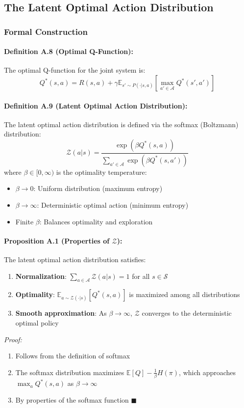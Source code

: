 \documentclass[10pt, letterpaper]{article}
\begin{document}
\subsection{The Latent Optimal Action Distribution}

\subsubsection{Formal Construction}

\paragraph{Definition A.8 (Optimal Q-Function):} The optimal Q-function for the joint system is:
\[Q^*(s, a) = R(s, a) + \gamma \mathbb{E}_{s' \sim P(\cdot|s,a)} \left[ \max_{a' \in \mathcal{A}} Q^*(s', a') \right]\]

\paragraph{Definition A.9 (Latent Optimal Action Distribution):} The latent optimal action distribution is defined via the softmax (Boltzmann) distribution:
\[\mathcal{Z}(a|s) = \frac{\exp(\beta Q^*(s,a))}{\sum_{a' \in \mathcal{A}} \exp(\beta Q^*(s,a'))}\]
where $\beta \in [0, \infty)$ is the optimality temperature:
\begin{itemize}
    \item $\beta \to 0$: Uniform distribution (maximum entropy)
    \item $\beta \to \infty$: Deterministic optimal action (minimum entropy)
    \item Finite $\beta$: Balances optimality and exploration
\end{itemize}

\paragraph{Proposition A.1 (Properties of $\mathcal{Z}$):} The latent optimal action distribution satisfies:
\begin{enumerate}
    \item \textbf{Normalization}: $\sum_{a \in \mathcal{A}} \mathcal{Z}(a|s) = 1$ for all $s \in \mathcal{S}$
    \item \textbf{Optimality}: $\mathbb{E}_{a \sim \mathcal{Z}(\cdot|s)}[Q^*(s,a)]$ is maximized among all distributions
    \item \textbf{Smooth approximation}: As $\beta \to \infty$, $\mathcal{Z}$ converges to the deterministic optimal policy
\end{enumerate}
\emph{Proof:}
\begin{enumerate}
    \item Follows from the definition of softmax
    \item The softmax distribution maximizes $\mathbb{E}[Q] - \frac{1}{\beta}H(\pi)$, which approaches $\max_a Q^*(s,a)$ as $\beta \to \infty$
    \item By properties of the softmax function $\blacksquare$
\end{enumerate}
\end{document}
